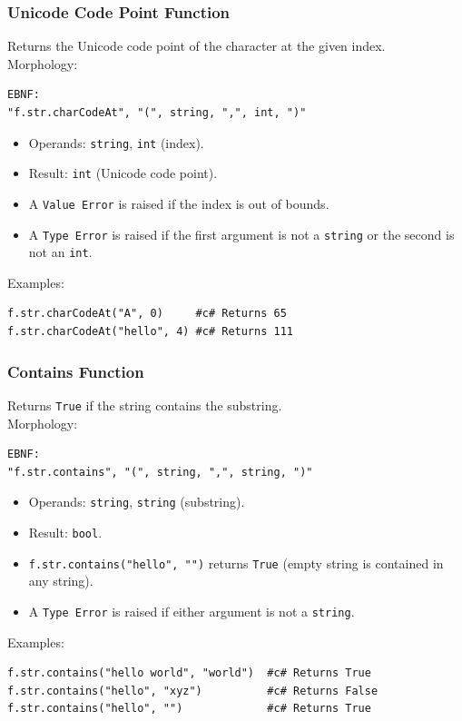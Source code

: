 \subsubsection{Unicode Code Point Function}
Returns the Unicode code point of the character at the given index. \\
Morphology:
\begin{verbatim}
EBNF:
"f.str.charCodeAt", "(", string, ",", int, ")"
\end{verbatim}
\begin{itemize}
\item Operands: \texttt{string}, \texttt{int} (index).
\item Result: \texttt{int} (Unicode code point).
\item A \texttt{Value Error} is raised if the index is out of bounds.
\item A \texttt{Type Error} is raised if the first argument is not a \texttt{string} or the second is not an \texttt{int}.
\end{itemize}
Examples:
\begin{verbatim}
f.str.charCodeAt("A", 0)     #c# Returns 65
f.str.charCodeAt("hello", 4) #c# Returns 111
\end{verbatim}

\subsubsection{Contains Function}
Returns \texttt{True} if the string contains the substring. \\
Morphology:
\begin{verbatim}
EBNF:
"f.str.contains", "(", string, ",", string, ")"
\end{verbatim}
\begin{itemize}
\item Operands: \texttt{string}, \texttt{string} (substring).
\item Result: \texttt{bool}.
\item \texttt{f.str.contains("hello", "")} returns \texttt{True} (empty string is contained in any string).
\item A \texttt{Type Error} is raised if either argument is not a \texttt{string}.
\end{itemize}
Examples:
\begin{verbatim}
f.str.contains("hello world", "world")  #c# Returns True
f.str.contains("hello", "xyz")          #c# Returns False
f.str.contains("hello", "")             #c# Returns True
\end{verbatim}

